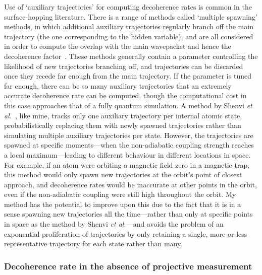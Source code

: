 Use of `auxiliary trajectories' for computing decoherence rates is common in the surface-hopping literature. There is a range of methods called `multiple spawning' methods, in which additional auxiliary trajectories regularly branch off the main trajectory (the one corresponding to the hidden variable), and are all considered in order to compute the overlap with the main wavepacket and hence the decoherence factor~\cite{doi:10.1021/jp994174i, doi:10.1063/1.476142, doi:10.1063/1.3103930}. These methods generally contain a parameter controlling the likelihood of new trajectories branching off, and trajectories can be discarded once they recede far enough from the main trajectory. If the parameter is tuned far enough, there can be so many auxiliary trajectories that an extremely accurate decoherence rate can be computed, though the computational cost in this case approaches that of a fully quantum simulation. A method by Shenvi \emph{et al.}~\cite{doi:10.1063/1.3575588}, like mine, tracks only one auxiliary trajectory per internal atomic state, probabilistically replacing them with newly spawned trajectories rather than simulating multiple auxiliary trajectories per state. However, the trajectories are spawned at specific moments---when the non-adiabatic coupling strength reaches a local maximum---leading to different behaviour in different locations in space. For example, if an atom were orbiting a magnetic field zero in a magnetic trap, this method would only spawn new trajectories at the orbit's point of closest approach, and decoherence rates would be inaccurate at other points in the orbit, even if the non-adiabatic coupling were still high throughout the orbit. My method has the potential to improve upon this due to the fact that it is in a sense spawning new trajectories all the time---rather than only at specific points in space as the method by Shenvi \emph{et al.}---and avoids the problem of an exponential proliferation of trajectories by only retaining a single, more-or-less representative trajectory for each state rather than many. 

\subsubsection{Decoherence rate in the absence of projective measurement}\label{sec:decoherence_without_projection}

